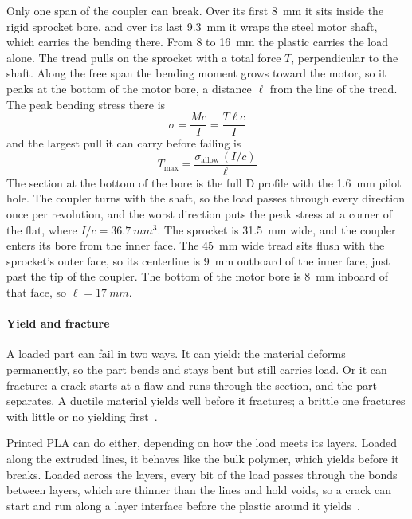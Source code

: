 Only one span of the coupler can break. Over its first \qty{8}{mm} it sits inside the rigid sprocket bore, and over its last \qty{9.3}{mm} it wraps the steel motor shaft, which carries the bending there. From 8 to \qty{16}{mm} the plastic carries the load alone. The tread pulls on the sprocket with a total force $T$, perpendicular to the shaft. Along the free span the bending moment grows toward the motor, so it peaks at the bottom of the motor bore, a distance $\ell$ from the line of the tread. The peak bending stress there is
\begin{equation}
  \sigma = \frac{M c}{I} = \frac{T \ell c}{I}
  \label{eq:bending}
\end{equation}
and the largest pull it can carry before failing is
\begin{equation}
  T_\mathrm{max} = \frac{\sigma_\mathrm{allow}\,(I/c)}{\ell}
  \label{eq:tmax}
\end{equation}
The section at the bottom of the bore is the full D profile with the \qty{1.6}{mm} pilot hole. The coupler turns with the shaft, so the load passes through every direction once per revolution, and the worst direction puts the peak stress at a corner of the flat, where $I/c = \qty{36.7}{mm^3}$. The sprocket is \qty{31.5}{mm} wide, and the coupler enters its bore from the inner face. The \qty{45}{mm} wide tread sits flush with the sprocket's outer face, so its centerline is \qty{9}{mm} outboard of the inner face, just past the tip of the coupler. The bottom of the motor bore is \qty{8}{mm} inboard of that face, so $\ell = \qty{17}{mm}$.

\paragraph{Yield and fracture}
A loaded part can fail in two ways. It can yield: the material deforms permanently, so the part bends and stays bent but still carries load. Or it can fracture: a crack starts at a flaw and runs through the section, and the part separates. A ductile material yields well before it fractures; a brittle one fractures with little or no yielding first~\cite{callister}.

Printed PLA can do either, depending on how the load meets its layers. Loaded along the extruded lines, it behaves like the bulk polymer, which yields before it breaks. Loaded across the layers, every bit of the load passes through the bonds between layers, which are thinner than the lines and hold voids, so a crack can start and run along a layer interface before the plastic around it yields~\cite{kuznetsov}.

